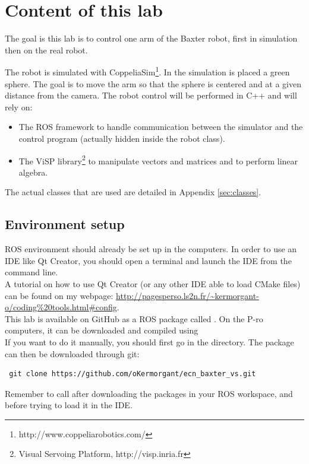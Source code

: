 \documentclass{ecnreport}
\begin{document}


\section{Content of this lab}

The goal is this lab is to control one arm of the Baxter robot, first in simulation then on the real robot. 

The robot is simulated with CoppeliaSim\footnote{http://www.coppeliarobotics.com/}.
In the simulation is placed a green sphere. The goal is to move the arm so that the sphere is centered and at a given distance from the camera.
The robot control will be performed in C++ and will rely on:

\begin{itemize}
 \item The ROS framework to handle communication between the simulator and the control program (actually hidden inside the robot class).
 \item The ViSP library\footnote{Visual Servoing Platform, http://visp.inria.fr} to manipulate vectors and matrices and to perform linear algebra.
\end{itemize}
The actual classes that are used are detailed in Appendix \ref{sec:classes}.\\

\subsection{Environment setup}

ROS environment should already be set up in the computers. 
In order to use an IDE like Qt Creator, you should open a terminal and launch the IDE from the command line.\\ A tutorial on how to use Qt Creator (or any other IDE 
able to load CMake files) can be found on my webpage: \url{http://pagesperso.ls2n.fr/~kermorgant-o/coding\%20tools.html#config}.\\

This lab is available on GitHub as a ROS package called .
On the P-ro computers, it can be downloaded and compiled using \\

If you want to do it manually, you should first go in the  directory. The package can then be downloaded through git:
\begin{center}\cppstyle
\begin{lstlisting}
 git clone https://github.com/oKermorgant/ecn_baxter_vs.git
\end{lstlisting}
\end{center}
Remember to call {} after downloading the packages in your ROS workspace, and before trying to load it in the IDE.
\end{document}
